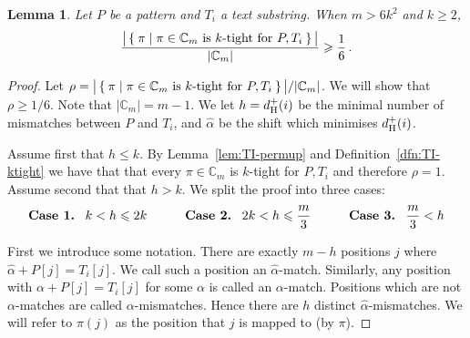 \documentclass[11pt]{article}
\renewcommand{\geq}{\geqslant}
\renewcommand{\leq}{\leqslant}
\newcommand{\alphah}{\widehat{\alpha}}
\newcommand{\Fam}{\ensuremath{\mathbb{C}_m}}
\newcommand{\DsHam}{\ensuremath{d_\textup{H}^+}}
\newcommand{\dHam}{\DsHam}
\theoremstyle{plain}
\newtheorem{lemma}[theorem]{Lemma}
\theoremstyle{definition}
\begin{document}
\begin{lemma}
    \label{lem:k-tight}
    Let $P$ be a pattern and $T_i$ a text substring. When $m > 6k^2$ and $k \geq 2$,
\begin{equation*}
        \frac{\big|\Set{ \pi | \pi\in \Fam \text { is $k$-tight for $P,T_i$} } \big|}{|\Fam|} \geq \frac{1}{6} \,.
    \end{equation*}
\end{lemma}
\begin{proof}
    Let $\rho = \big|\Set{ \pi | \pi\in \Fam \text { is $k$-tight for $P,T_i$} } \big|/|\Fam|$. We will show that $\rho\geq 1/6$. Note that $|\Fam|=m-1$. We let $h=\dHam(i)$ be the minimal number of mismatches between $P$ and $T_i$, and $\alphah$ be the shift which minimises $\dHam(i)$.

    Assume first that $h \leq k$. By Lemma~\ref{lem:TI-permup} and Definition~\ref{dfn:TI-ktight} we have that that every $\pi\in\Fam$ is $k$-tight for $P,T_i$ and therefore $\rho=1$. Assume second that that $h>k$.  We split the proof into three cases:
\begin{equation*}
        \textbf{Case 1. \;} k < h \leq 2k \qquad\quad
        \textbf{Case 2. \;} 2k < h \leq \frac{m}{3} \qquad\quad
        \textbf{Case 3. \;} \frac{m}{3} < h
    \end{equation*}

    First we introduce some notation. There are exactly $m-h$ positions $j$ where $\alphah+P[j]=T_i[j]$. We call such a position an $\alphah$-match. Similarly, any position with $\alpha+P[j]=T_i[j]$ for some $\alpha$ is called an $\alpha$-match. Positions which are not $\alpha$-matches are called $\alpha$-mismatches. Hence there are $h$ distinct $\alphah$-mismatches. We will refer to $\pi(j)$ as the position that $j$ is mapped to (by $\pi$).
    \medskip


\end{proof}
\end{document}
